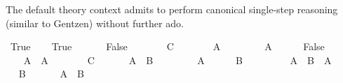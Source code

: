 \begin{isabellebody}
\isamarkupfalse%
\isamarkupfalse%
%
\isamarkuptrue%
%
\isamarkuptrue%
%
\begin{isamarkuptext}%
The default theory context admits to perform canonical single-step
  reasoning (similar to Gentzen) without further ado.%
\end{isamarkuptext}%
\isamarkuptrue%
\ True\isanewline
\isamarkupfalse%
\isanewline
\isanewline
\ \ \isamarkupfalse%
\ True\ \isamarkupfalse%
\isacommand{{\isachardot}{\isachardot}}\isanewline
\isanewline
\ \ \isamarkupfalse%
\isacommand{{\isacharbraceleft}}\ \isamarkupfalse%
\ False\isanewline
\ \ \ \ \isamarkupfalse%
\ \isamarkupfalse%
\ C\ \isamarkupfalse%
\isacommand{{\isachardot}{\isachardot}}\ \isamarkupfalse%
\isacommand{{\isacharbraceright}}\isanewline
\isanewline
\ \ \isamarkupfalse%
\ {\isachardoublequote}{\isasymnot}\ A{\isachardoublequote}\isanewline
\ \ \isamarkupfalse%
\isanewline
\ \ \ \ \isamarkupfalse%
\ A\isanewline
\ \ \ \ \isamarkupfalse%
\ False\ \isamarkupfalse%
\isanewline
\ \ \isamarkupfalse%
\isanewline
\isanewline
\ \ \isamarkupfalse%
\isacommand{{\isacharbraceleft}}\ \isamarkupfalse%
\ {\isachardoublequote}{\isasymnot}\ A{\isachardoublequote}\ \ A\isanewline
\ \ \ \ \isamarkupfalse%
\ \isamarkupfalse%
\ C\ \isamarkupfalse%
\isacommand{{\isachardot}{\isachardot}}\ \isamarkupfalse%
\isacommand{{\isacharbraceright}}\isanewline
\isanewline
\ \ \isamarkupfalse%
\ {\isachardoublequote}A\ {\isasymlongrightarrow}\ B{\isachardoublequote}\isanewline
\ \ \isamarkupfalse%
\isanewline
\ \ \ \ \isamarkupfalse%
\ A\isanewline
\ \ \ \ \isamarkupfalse%
\ B\ \isamarkupfalse%
\isanewline
\ \ \isamarkupfalse%
\isanewline
\isanewline
\ \ \isamarkupfalse%
\isacommand{{\isacharbraceleft}}\ \isamarkupfalse%
\ {\isachardoublequote}A\ {\isasymlongrightarrow}\ B{\isachardoublequote}\ \ A\isanewline
\ \ \ \ \isamarkupfalse%
\ \isamarkupfalse%
\ B\ \isamarkupfalse%
\isacommand{{\isachardot}{\isachardot}}\ \isamarkupfalse%
\isacommand{{\isacharbraceright}}\isanewline
\isanewline
\ \ \isamarkupfalse%
\ {\isachardoublequote}A\ {\isasymand}\ B{\isachardoublequote}\isanewline

\end{isabellebody}
